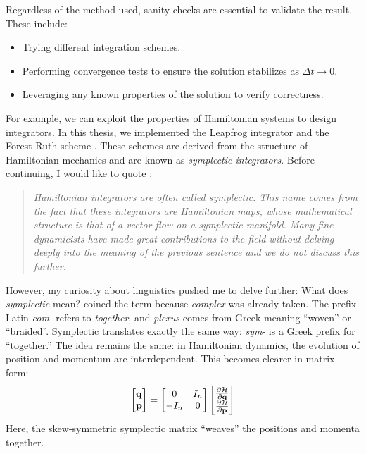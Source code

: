    Regardless of the method used, sanity checks are essential to validate the result. These include:
    \begin{itemize}
        \item Trying different integration schemes.
        \item Performing convergence tests to ensure the solution stabilizes as \( \Delta t \to 0 \).
        \item Leveraging any known properties of the solution to verify correctness.
    \end{itemize}
    For example, we can exploit the properties of Hamiltonian systems to design integrators. In this thesis, we implemented the Leapfrog integrator and the Forest-Ruth scheme \citep{bovy_inprep, 1990PhyD...43..105F}. These schemes are derived from the structure of Hamiltonian mechanics and are known as \textit{symplectic integrators}. Before continuing, I would like to quote \citep{bovy_inprep}:
    \begin{quote}
        \textit{Hamiltonian integrators are often called symplectic. This name comes from the fact that these integrators are Hamiltonian maps, whose mathematical structure is that of a vector flow on a symplectic manifold. Many fine dynamicists have made great contributions to the field without delving deeply into the meaning of the previous sentence and we do not discuss this further.}
    \end{quote}
    However, my curiosity about linguistics pushed me to delve further: What does \textit{symplectic} mean? \citet{weyl1946classical} coined the term because \textit{complex} was already taken. The prefix Latin \textit{com}- refers to \textit{together}, and \textit{plexus} comes from Greek meaning ``woven'' or ``braided''. Symplectic translates exactly the same way: \textit{sym}- is a Greek prefix for ``together.'' The idea remains the same: in Hamiltonian dynamics, the evolution of position and momentum are interdependent. This becomes clearer in matrix form:
    \begin{equation}
        \begin{bmatrix}
            \dot{\bf{q}}\\
            \dot{\bf{p}}
        \end{bmatrix}
         = 
        \begin{bmatrix}
            0 & I_n \\
            -I_n & 0 
        \end{bmatrix}
                \begin{bmatrix}
            \frac{\partial \mathcal{H}}{\partial \bf{q}} \\
            \frac{\partial \mathcal{H}}{\partial \bf{p}}
        \end{bmatrix}
        \label{eq:symplectic}
    \end{equation}
    Here, the skew-symmetric symplectic matrix ``weaves'' the positions and momenta together.

